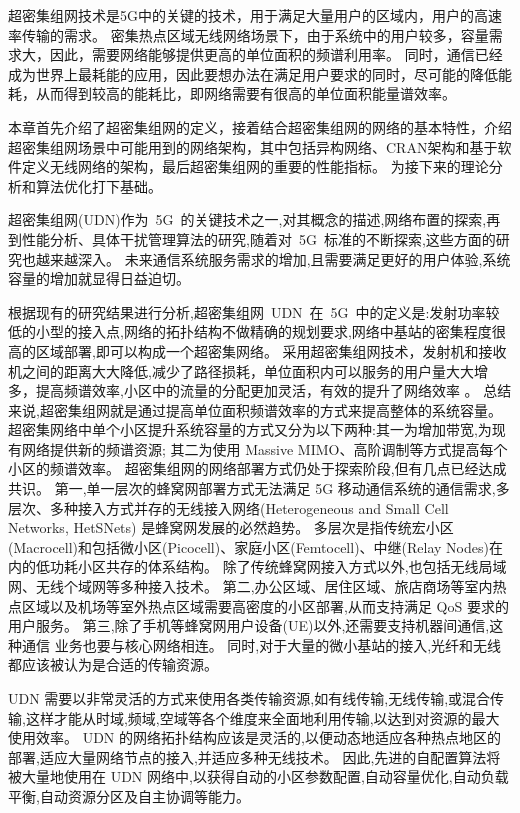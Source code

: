 


超密集组网技术是5G中的关键的技术，用于满足大量用户的区域内，用户的高速率传输的需求。
密集热点区域无线网络场景下，由于系统中的用户较多，容量需求大，因此，需要网络能够提供更高的单位面积的频谱利用率。
同时，通信已经成为世界上最耗能的应用，因此要想办法在满足用户要求的同时，尽可能的降低能耗，从而得到较高的能耗比，即网络需要有很高的单位面积能量谱效率。

本章首先介绍了超密集组网的定义，接着结合超密集组网的网络的基本特性，介绍超密集组网场景中可能用到的网络架构，其中包括异构网络、CRAN架构和基于软件定义无线网络的架构，最后超密集组网的重要的性能指标。
为接下来的理论分析和算法优化打下基础。

超密集组网(UDN)作为~5G~的关键技术之一,对其概念的描述,网络布置的探索,再到性能分析、具体干扰管理算法的研究,随着对~5G~标准的不断探索,这些方面的研究也越来越深入。
未来通信系统服务需求的增加,且需要满足更好的用户体验,系统容量的增加就显得日益迫切。

根据现有的研究结果进行分析,超密集组网~UDN~在~5G~中的定义是:发射功率较低的小型的接入点,网络的拓扑结构不做精确的规划要求,网络中基站的密集程度很高的区域部署,即可以构成一个超密集网络。
采用超密集组网技术，发射机和接收机之间的距离大大降低,减少了路径损耗，单位面积内可以服务的用户量大大增多，提高频谱效率,小区中的流量的分配更加灵活，有效的提升了网络效率 。
总结来说,超密集组网就是通过提高单位面积频谱效率的方式来提高整体的系统容量。
超密集网络中单个小区提升系统容量的方式又分为以下两种:其一为增加带宽,为现有网络提供新的频谱资源;
其二为使用 Massive MIMO、高阶调制等方式提高每个小区的频谱效率。
超密集组网的网络部署方式仍处于探索阶段,但有几点已经达成共识。
第一,单一层次的蜂窝网部署方式无法满足 5G 移动通信系统的通信需求,多层次、多种接入方式并存的无线接入网络(Heterogeneous and Small Cell Networks, HetSNets)
是蜂窝网发展的必然趋势。
多层次是指传统宏小区(Macrocell)和包括微小区(Picocell)、家庭小区(Femtocell)、中继(Relay Nodes)在内的低功耗小区共存的体系结构。
除了传统蜂窝网接入方式以外,也包括无线局域网、无线个域网等多种接入技术。
第二,办公区域、居住区域、旅店商场等室内热点区域以及机场等室外热点区域需要高密度的小区部署,从而支持满足 QoS 要求的用户服务。
第三,除了手机等蜂窝网用户设备(UE)以外,还需要支持机器间通信,这种通信
业务也要与核心网络相连。
同时,对于大量的微小基站的接入,光纤和无线都应该被认为是合适的传输资源。

UDN 需要以非常灵活的方式来使用各类传输资源,如有线传输,无线传输,或混合传输,这样才能从时域,频域,空域等各个维度来全面地利用传输,以达到对资源的最大使用效率。
UDN 的网络拓扑结构应该是灵活的,以便动态地适应各种热点地区的部署,适应大量网络节点的接入,并适应多种无线技术。
因此,先进的自配置算法将被大量地使用在 UDN 网络中,以获得自动的小区参数配置,自动容量优化,自动负载平衡,自动资源分区及自主协调等能力。

